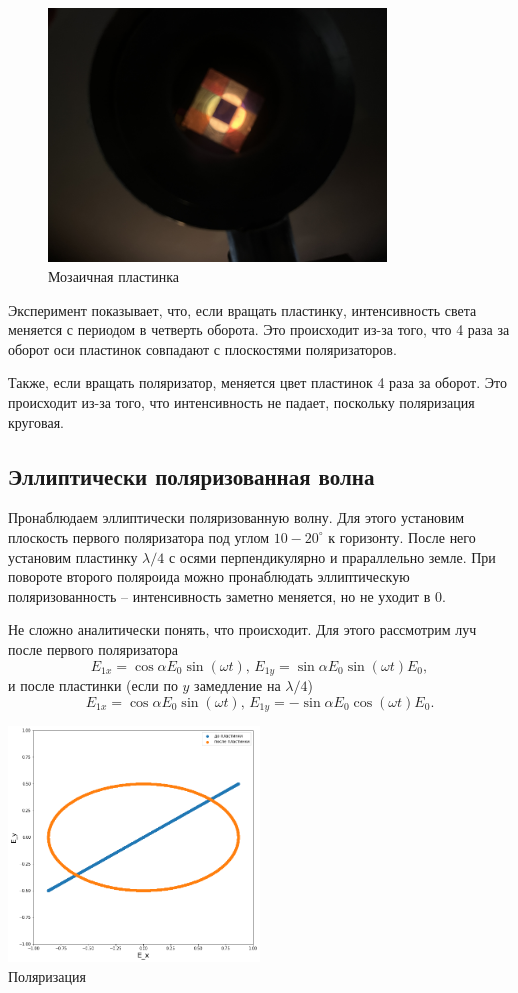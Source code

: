 \begin{figure}[H]
\centering
\includegraphics[width=0.80\textwidth]{IMG_3198.JPG}
\caption{Мозаичная пластинка}
\end{figure}

Эксперимент показывает, что, если вращать пластинку, интенсивность света меняется с периодом в четверть оборота. Это происходит из-за того, что 4 раза за оборот оси пластинок совпадают с плоскостями поляризаторов.

Также, если вращать поляризатор, меняется цвет пластинок 4 раза за оборот. Это происходит из-за того, что интенсивность не падает, поскольку поляризация круговая.


\subsection*{Эллиптически поляризованная волна}
Пронаблюдаем эллиптически поляризованную волну. Для этого установим плоскость первого поляризатора под углом $10-20^\circ$ к горизонту. После него установим пластинку $\lambda/4$ с осями перпендикулярно и прараллельно земле.
При повороте второго поляроида можно пронаблюдать эллиптическую поляризованность -- интенсивность заметно меняется, но не уходит в 0.

Не сложно аналитически понять, что происходит. Для этого рассмотрим луч после первого поляризатора
\[E_{1x} = \cos\alpha E_0 \sin(\omega t),\,E_{1y} = \sin\alpha E_0 \sin(\omega t) E_0,\]
и после пластинки (если по $y$ замедление на $\lambda / 4$)
\[E_{1x} = \cos\alpha E_0 \sin(\omega t),\,E_{1y} = - \sin\alpha E_0 \cos(\omega t) E_0.\]

\begin{center}
\includegraphics[width=0.50\textwidth]{7.png}\\
Поляризация
\end{center}

